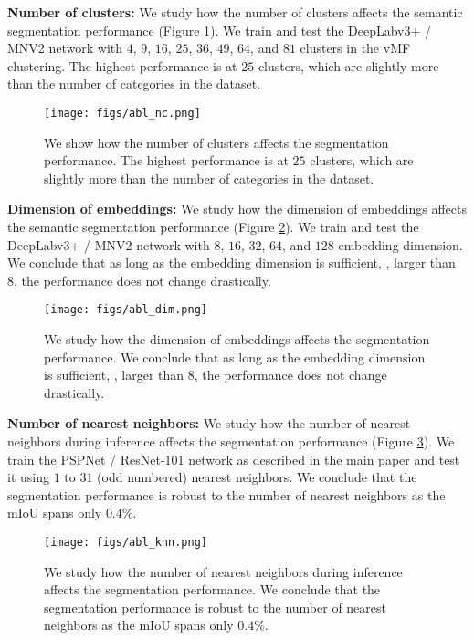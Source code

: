 \documentclass[10pt,twocolumn,letterpaper]{article}
\begin{document}
{\bf Number of clusters:} We study how the number of clusters affects the semantic segmentation performance (Figure \ref{fig:abl_nc}). We train and test the DeepLabv3+ / MNV2 network with $4$, $9$, $16$, $25$, $36$, $49$, $64$, and $81$ clusters in the vMF clustering. The highest performance is at $25$ clusters, which are slightly more than the number of categories in the dataset.


\begin{figure}
    \centering
    \texttt{[image: figs/abl\_nc.png]}
    \caption{We show how the number of clusters affects the segmentation performance. The highest performance is at $25$ clusters, which are slightly more than the number of categories in the dataset.}
    \label{fig:abl_nc}
\end{figure}



{\bf Dimension of embeddings:} We study how the dimension of embeddings affects the semantic segmentation performance (Figure \ref{fig:abl_dim}). We train and test the DeepLabv3+ / MNV2 network with $8$, $16$, $32$, $64$, and $128$ embedding dimension. We conclude that as long as the embedding dimension is sufficient, \ie, larger than 8, the performance does not change drastically.

\begin{figure}
    \centering
    \texttt{[image: figs/abl\_dim.png]}
    \caption{We study how the dimension of embeddings affects the segmentation performance. We conclude that as long as the embedding dimension is sufficient, \ie, larger than 8, the performance does not change drastically.}
    \label{fig:abl_dim}
\end{figure}









{\bf Number of nearest neighbors:} We study how the number of nearest neighbors during inference affects the segmentation performance  (Figure \ref{fig:abl_knn}). We train the PSPNet / ResNet-101 network as described in the main paper and test it using $1$ to $31$ (odd numbered) nearest neighbors. We conclude that the segmentation performance is robust to the number of nearest neighbors as the mIoU spans only $0.4\%$.


\begin{figure}
    \centering
    \texttt{[image: figs/abl\_knn.png]}
    \caption{We study how the number of nearest neighbors during inference affects the segmentation performance. We conclude that the segmentation performance is robust to the number of nearest neighbors as the mIoU spans only $0.4\%$.}
    \label{fig:abl_knn}
\end{figure}
\end{document}
